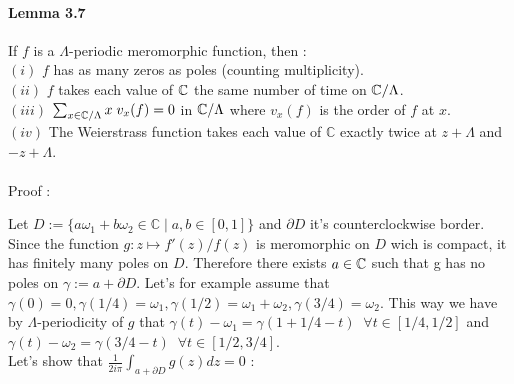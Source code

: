 \documentclass[letterpaper,10pt]{article}
\begin{document}
\paragraph{Lemma 3.7} If $f$ is a $\Lambda$-periodic meromorphic function, then :   \\$(i)$ $f$ has as many zeros as poles (counting multiplicity). \\
$(ii)$ $f$ takes each value of $\mathbb{C}$ the same number of time on $\mathbb{C} / \Lambda$.\\
$(iii)$ $\sum_{x\in \mathbb{C} /\Lambda } x\; v_x(f) = 0$ in $\mathbb{C}/\Lambda$ where $v_x(f )$ is the order of $f$ at $x$.\\
$(iv)$ The Weierstrass function takes each value of $\mathbb{C}$ exactly twice at $z + \Lambda$ and $-z + \Lambda$.
{\itshape \paragraph{} Proof :} Let $ D:=\{a\omega_1+b\omega_2 \in \mathbb{C} \;|\; a,b\in [0,1]\}$ and $\partial D$ it's counterclockwise border. 
Since the function $g: z\mapsto f'(z)/f(z)$ 
is meromorphic on $D$ wich is compact, it has finitely many poles on $D$. Therefore there exists $a\in\mathbb{C}$ such that g has no poles on $\gamma := a + \partial D$.
Let's for example assume that $\gamma(0) = 0, \gamma(1/4) = \omega_1, \gamma(1/2) = \omega_1 + \omega_2, \gamma(3/4) = \omega_2.$
This way we have by $\Lambda$-periodicity of $g$ that $\gamma(t)-\omega_1 = \gamma(1 + 1/4 -t) \;\;\forall t\in [1/4,1/2]$ and 
$\gamma(t)-\omega_2 = \gamma(3/4 -t)\;\; \forall t\in [1/2,3/4]$.\\
Let's show that $\frac{1}{2i\pi}\int_{a + \partial D} g(z)dz = 0$ : 
\end{document}
